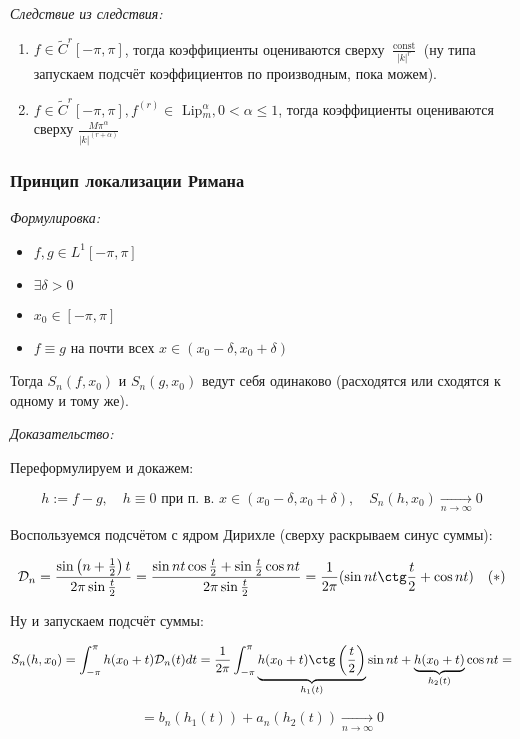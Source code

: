 \documentclass{article}
\def\goesto#1{\underset{#1}{\longrightarrow}}
\def\toinf#1{\goesto{#1 \rightarrow \infty}}
\def\ntoinf{\toinf{n}}
\def\DD{\mathcal{D}}
\DeclareMathOperator{\const}{const}
\begin{document}
\textit{Следствие из следствия:}

\begin{enumerate}
    \item $f \in \tilde{C}^r[-\pi, \pi]$, тогда коэффициенты оцениваются сверху $\frac{\const}{|k|^r}$ (ну типа запускаем подсчёт коэффициентов по производным, пока можем).
    \item $f \in \tilde{C}^r[-\pi, \pi], f^{(r)} \in$ Lip$_m^\alpha, 0 < \alpha \le 1$, тогда коэффициенты оцениваются сверху $\frac{M \pi^\alpha}{|k|^{(r + \alpha)}}$
\end{enumerate}

\subsubsection{Принцип локализации Римана}
\textit{Формулировка:}

\begin{itemize}
    \item $f, g \in L^1[-\pi, \pi]$
    \item $\exists \delta > 0$
    \item $x_0 \in [-\pi, \pi]$
    \item $f \equiv g$ на почти всех $x \in (x_0 - \delta, x_0 + \delta)$
\end{itemize}

Тогда $S_n(f, x_0)$ и $S_n(g, x_0)$ ведут себя одинаково (расходятся или сходятся к одному и тому же).

\textit{Доказательство:}

Переформулируем и докажем:

\[h := f - g, \quad h \equiv 0 \text{ при п. в. } x \in (x_0 - \delta, x_0 + \delta), \quad S_n(h, x_0) \ntoinf 0\]

Воспользуемся подсчётом с ядром Дирихле (сверху раскрываем синус суммы):

\[\DD_n = \frac{\sin \left( n + \frac{1}{2}\right)t}{2\pi\sin \frac{t}{2}} = \frac{\sin nt \cos \frac{t}{2} + \sin\frac{t}{2}\cos nt}{2\pi\sin \frac{t}{2}} = \frac{1}{2\pi}(\sin nt \ctg \frac{t}{2} + \cos nt) \quad (*)\]

Ну и запускаем подсчёт суммы:

\[S_n(h, x_0) = \int_{-\pi}^{\pi} h(x_0 + t) \DD_n(t) dt = \frac{1}{2\pi}\int_{-\pi}^{\pi}\underbrace{h(x_0 + t) \ctg \left(\frac{t}{2}\right)}_{h_1(t)}\sin nt + \underbrace{h(x_0 + t)}_{h_2(t)}\cos nt = \]

\[= b_n(h_1(t)) + a_n(h_2(t)) \ntoinf 0\]
\end{document}
